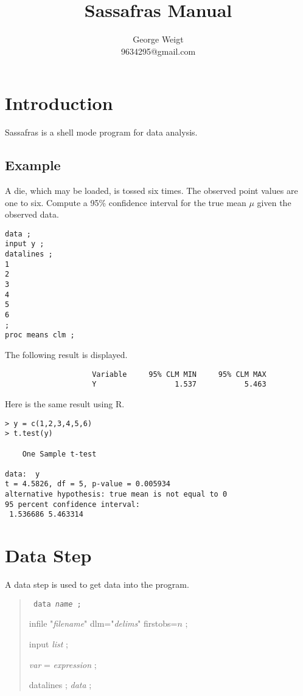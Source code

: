\documentclass[12pt]{article}
\title{Sassafras Manual}
\author{George Weigt\\9634295@gmail.com}
\begin{document}
\maketitle

\tableofcontents

\newpage

\section{Introduction}

Sassafras is a shell mode program for data analysis.

\subsection*{Example}

A die, which may be loaded, is tossed six times.
The observed point values are one to six.
Compute a 95\% confidence interval for the true mean $\mu$
given the observed data.

{\scriptsize\begin{verbatim}
data ;
input y ;
datalines ;
1
2
3
4
5
6
;
proc means clm ;
\end{verbatim}}

The following result is displayed.

{\scriptsize\begin{verbatim}
                    Variable     95% CLM MIN     95% CLM MAX
                    Y                  1.537           5.463
\end{verbatim}}

Here is the same result using R.

{\scriptsize\begin{verbatim}
> y = c(1,2,3,4,5,6)
> t.test(y)

	One Sample t-test

data:  y
t = 4.5826, df = 5, p-value = 0.005934
alternative hypothesis: true mean is not equal to 0
95 percent confidence interval:
 1.536686 5.463314
\end{verbatim}}

\newpage

\section{Data Step}
A data step is used to get data into the program.

\begin{quote}
{\tt
data {\it name} ;

infile "{\it filename}" dlm="{\it delims}" firstobs=$n$ ;

input {\it list} ;

{\it var} = {\it expression} ;

datalines ; {\it data} ;
}
\end{quote}
\end{document}
